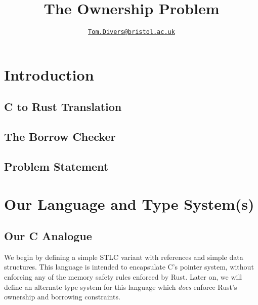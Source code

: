 \documentclass{article}
\title{The Ownership Problem}
\author{\href{mailto:oi24939@bristol.ac.uk}{\texttt{Tom.Divers@bristol.ac.uk}}}
\date{}
\begin{document}
\maketitle

\section{Introduction}

\subsection{C to Rust Translation}

\cite{zhang2023crown}

\subsection{The Borrow Checker}

\subsection{Problem Statement}

\section{Our Language and Type System(s)}

\subsection{Our C Analogue}

We begin by defining a simple STLC variant with references and simple data structures. This language is intended to encapsulate C's pointer system, without enforcing any of the memory safety rules enforced by Rust. Later on, we will define an alternate type system for this language which \textit{does} enforce Rust's ownership and borrowing constraints.
\end{document}

